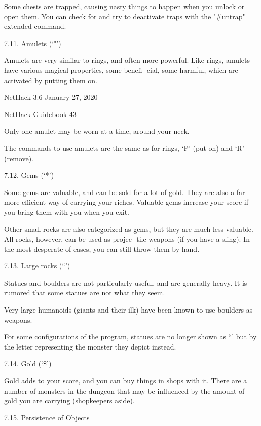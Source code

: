 \documentclass[11pt]{article}
\begin{document}
   Some chests are trapped, causing nasty things to happen when
you unlock or open them. You can check for and try to deactivate
traps with the "\#untrap" extended command.

7.11. Amulets (`"')

   Amulets are very similar to rings, and often more powerful.
Like rings, amulets have various magical properties, some benefi-
cial, some harmful, which are activated by putting them on.




NetHack 3.6                   January 27, 2020





NetHack Guidebook                       43



Only one amulet may be worn at a time, around your neck.

   The commands to use amulets are the same as for rings, `P'
(put on) and `R' (remove).

7.12. Gems (`*')

   Some gems are valuable, and can be sold for a lot of gold.
They are also a far more efficient way of carrying your riches.
Valuable gems increase your score if you bring them with you when
you exit.

   Other small rocks are also categorized as gems, but they are
much less valuable. All rocks, however, can be used as projec-
tile weapons (if you have a sling). In the most desperate of
cases, you can still throw them by hand.

7.13. Large rocks (``')

   Statues and boulders are not particularly useful, and are
generally heavy.  It is rumored that some statues are not what
they seem.

   Very large humanoids (giants and their ilk) have been known
to use boulders as weapons.

   For some configurations of the program, statues are no
longer shown as ``' but by the letter representing the monster
they depict instead.

7.14. Gold (`\$')

   Gold adds to your score, and you can buy things in shops
with it. There are a number of monsters in the dungeon that may
be influenced by the amount of gold you are carrying (shopkeepers
aside).

7.15. Persistence of Objects
\end{document}
